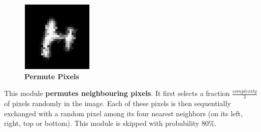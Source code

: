 \documentclass{article} %
\begin{document}
\begin{minipage}[t]{\linewidth}
\begin{figure}
\vspace*{-5mm}
\begin{center}
\includegraphics[scale=.4]{images/Permutpixel_only.png}\\
{\small\bf Permute Pixels}
\end{center}
\end{figure}
This module {\bf permutes neighbouring pixels}. It first selects a
fraction $\frac{complexity}{3}$ of pixels randomly in the image. Each
of these pixels is then sequentially exchanged with a random pixel
among its four nearest neighbors (on its left, right, top or bottom).
This module is skipped with probability 80\%.\\
\vspace*{1mm}
\end{minipage}

\vspace{-3mm}
\end{document}
